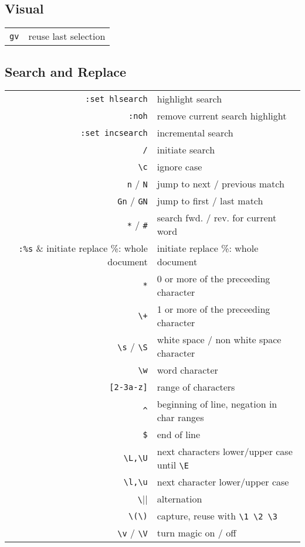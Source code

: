 \begin{multicols*}{3}
\subsection{Visual}
\begin{tabular}{@{}rl@{}}
    \verb|gv| & reuse last selection
\end{tabular}

\subsection{Search and Replace}
\begin{tabular}{@{}rl@{}}
    \verb|:set hlsearch| & highlight search \\
    \verb|:noh|      & remove current search highlight \\
    \verb|:set incsearch| & incremental search \\
    \verb|/|        & initiate search \\
    \verb|\c|      & ignore case \\
    \verb|n| / \verb|N| & jump to next / previous match \\
    \verb|Gn| / \verb|GN| & jump to first / last match \\
    \verb|*| / \verb|#| & search fwd. / rev. for current word \\
    \verb|:%s|      & initiate replace \%: whole document \\
    \verb|*|        & 0 or more of the preceeding character \\
    \verb|\+|       & 1 or more of the preceeding character \\
    \verb|\s| / \verb|\S|      & white space / non white space character \\
    \verb|\w|       & word character \\
    \verb|[2-3a-z]| & range of characters \\
    \verb|^|        & beginning of line, negation in char ranges \\
    \verb|$|        & end of line \\
    \verb|\L,\U|    & next characters lower/upper case until \verb|\E| \\
    \verb|\l,\u|    & next character lower/upper case \\
    \verb|\||       & alternation \\
    \verb|\(\)|     & capture, reuse with \verb|\1 \2 \3| \\
    \verb|\v| / \verb|\V| & turn magic on / off 
\end{tabular}


\end{multicols*}
